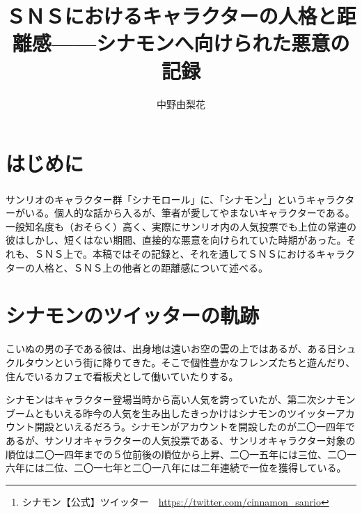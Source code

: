 \documentclass[b5j,twoside,twocolumn]{utarticle}
\title{\tbaselineshift =4.0pt ＳＮＳにおけるキャラクターの人格と距離感------シナモンへ向けられた悪意の記録}
\author{中野由梨花}
\date{\vspace{-5mm}}
\makeatletter
\def\yakuchu{%
\@ifnextchar[\@xfootnote %
{\stepcounter{yakuchu}%
\protected@xdef\@thefnmark{\theyakuchu}%
\@footnotemark\@footnotetext}}
\makeatother
\begin{document}
\maketitle

\setlength{\footskip}{-2mm}
\chead[]{}
\lfoot[]{\thepage{}}
\cfoot[]{}
\rfoot[\thepage{}]{}

\let\yakuchu=\endnote
\renewcommand{\footnoterule}{\noindent\rule{100mm}{0.3mm}\vskip2mm}
\thispagestyle{fancy}
\section*{はじめに}
サンリオのキャラクター群「シナモロール」に、「シナモン\footnote{シナモン【公式】ツイッター　\url{https://twitter.com/cinnamon_sanrio}}」というキャラクターがいる。個人的な話から入るが、筆者が愛してやまないキャラクターである。一般知名度も（おそらく）高く、実際にサンリオ内の人気投票でも上位の常連の彼はしかし、短くはない期間、直接的な悪意を向けられていた時期があった。それも、ＳＮＳ上で。本稿ではその記録と、それを通してＳＮＳにおけるキャラクターの人格と、ＳＮＳ上の他者との距離感について述べる。

\section*{シナモンのツイッターの軌跡}
こいぬの男の子である彼は、出身地は遠いお空の雲の上ではあるが、ある日シュクルタウンという街に降りてきた。そこで個性豊かなフレンズたちと遊んだり、住んでいるカフェで看板犬として働いていたりする。


シナモンはキャラクター登場当時から高い人気を誇っていたが、第二次シナモンブームともいえる昨今の人気を生み出したきっかけはシナモンのツイッターアカウント開設といえるだろう。シナモンがアカウントを開設したのが二〇一四年であるが、サンリオキャラクターの人気投票である、サンリオキャラクター対象の順位は二〇一四年までの５位前後の順位から上昇、二〇一五年には三位、二〇一六年には二位、二〇一七年と二〇一八年には二年連続で一位を獲得している。
\end{document}
